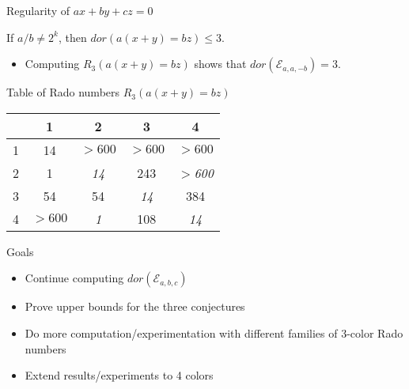 \documentclass{beamer}
\begin{document}
\begin{frame}{Regularity of $ax+by+cz = 0$}
\begin{theorem}[Rado]
	If $a/b \neq 2^k$, then $dor(a(x+y) = bz) \le 3$. 
\end{theorem}

\begin{itemize}
	\item \pause Computing $R_3(a(x+y) = bz)$ shows that $dor(\mathcal{E}_{a,a,-b}) = 3$. 
\end{itemize}
\pause 
Table of Rado numbers $R_3(a(x+y) = bz)$
\begin{center}
	\begin{tabular}{c|cccc}
		\diagbox{$b$}{$a$} & 1 &2 &3&4 \\
		\hline
		1 & 14 & $>600$ & $>600$ &$>600$ \\
		2& 1  &\textit{14} & 243 &$>$\textit{600}\\
		3& 54 & 54 &\textit{14} & 384 \\
		4& $>600$  & \textit{1} & 108 & \textit{14} \\ 
	\end{tabular}
\end{center}
\end{frame}

\begin{frame}{Goals}
\begin{itemize}
	\item Continue computing $dor(\mathcal{E}_{a,b,c})$
	\item \pause Prove upper bounds for the three conjectures
	\item \pause Do more computation/experimentation with different families of 3-color Rado numbers 
	\item \pause Extend results/experiments to 4 colors 
\end{itemize}
\end{frame}
\end{document}

